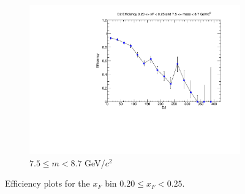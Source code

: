 \documentclass[11pt]{article}
\begin{document}
\begin{figure}[p]
\begin{subfigure}[b]{0.32\textwidth}
        \includegraphics[width=\textwidth]{./kTrackerEfficiencyPlots/D2_Efficiency_xF4_mass10.pdf}
        \caption{$7.5 \leq m < 8.7$ GeV/$c^2$}
    \end{subfigure}
    \caption{Efficiency plots for the $x_F$ bin $0.20 \leq x_F < 0.25$.}
\end{figure}
\end{document}

